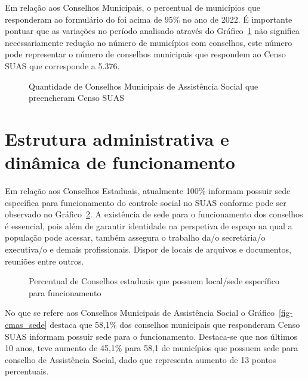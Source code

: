 \documentclass[
  letterpaper,
  DIV=11,
  numbers=noendperiod]{scrreprt}
\begin{document}
Em relação aos Conselhos Municipais, o percentual de municípios que
responderam ao formulário do foi acima de 95\% no ano de 2022. É
importante pontuar que as variações no período analisado através do
Gráfico~\ref{fig-qtd-cmas} não significa necessariamente redução no
número de municípios com conselhos, este número pode representar o
número de conselhos municipais que respondem ao Censo SUAS que
corresponde a 5.376.

\begin{figure}


\caption{\label{fig-qtd-cmas}Quantidade de Conselhos Municipais de
Assistência Social que preencheram Censo SUAS}

\end{figure}%

\section{Estrutura administrativa e dinâmica de
funcionamento}\label{estrutura-administrativa-e-dinuxe2mica-de-funcionamento}

Em relação aos Conselhos Estaduais, atualmente 100\% informam possuir
sede específica para funcionamento do controle social no SUAS conforme
pode ser observado no Gráfico~\ref{fig-ceas_sede}. A existência de sede
para o funcionamento dos conselhos é essencial, pois além de garantir
identidade na perspetiva de espaço na qual a população pode acessar,
também assegura o trabalho da/o secretária/o executiva/o e demais
profissionais. Dispor de locais de arquivos e documentos, reuniões entre
outros.

\begin{figure}


\caption{\label{fig-ceas_sede}Percentual de Conselhos estaduais que
possuem local/sede específico para funcionamento}

\end{figure}%

No que se refere aos Conselhos Municipais de Assistência Social o
Gráfico~\ref{fig-cmas_sede} destaca que 58,1\% dos conselhos municipais
que responderam Censo SUAS informam possuir sede para o funcionamento.
Destaca-se que nos últimos 10 anos, teve aumento de 45,1\% para 58,1 de
municípios que possuem sede para conselho de Assistência Social, dado
que representa aumento de 13 pontos percentuais.
\end{document}
